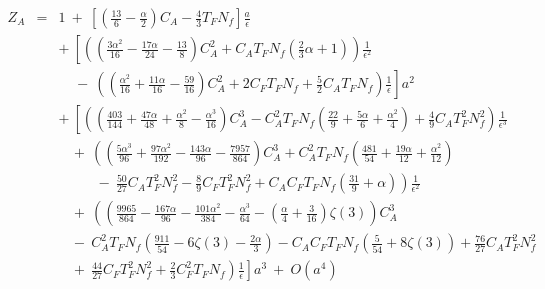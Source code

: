 \documentclass[a4paper,11pt]{article}
\newcommand{\Nf}{N_{\!f}}
\begin{document}
\begin{eqnarray} 
Z_A &=& 1 ~+~ \left[ \left( \frac{13}{6} - \frac{\alpha}{2} \right) C_A 
- \frac{4}{3} T_F \Nf \right] \frac{a}{\epsilon} \nonumber \\
&& +~ \left[ \left( \left( \frac{3\alpha^2}{16} - \frac{17\alpha}{24} 
- \frac{13}{8} \right) C_A^2 + C_A T_F\Nf \left( \frac{2}{3}\alpha + 1 \right) 
\right) \frac{1}{\epsilon^2} \right. \nonumber \\
&& \left. ~~~~~-~ \left( \left( \frac{\alpha^2}{16} + \frac{11\alpha}{16}
- \frac{59}{16} \right) C_A^2 + 2 C_F T_F\Nf + \frac{5}{2} C_A T_F \Nf \right) 
\frac{1}{\epsilon} \right] a^2 \nonumber \\ 
&& +~ \left[ \left( \left( \frac{403}{144} + \frac{47\alpha}{48} 
+ \frac{\alpha^2}{8} - \frac{\alpha^3}{16} \right) C_A^3 
- C_A^2 T_F\Nf \left( \frac{22}{9} + \frac{5\alpha}{6} + \frac{\alpha^2}{4} 
\right) + \frac{4}{9} C_A T_F^2 \Nf^2 \right) \frac{1}{\epsilon^3} \right. 
\nonumber \\
&& \left. ~~~~+~ \left( \left( \frac{5\alpha^3}{96} + \frac{97\alpha^2}{192} 
- \frac{143\alpha}{96} - \frac{7957}{864} \right) C_A^3 
+ C_A^2 T_F\Nf \left( \frac{481}{54} + \frac{19\alpha}{12} 
+ \frac{\alpha^2}{12} \right) \right. \right. \nonumber \\
&& \left. \left. ~~~~~~~~~~~~-~ \frac{50}{27} C_A T_F^2 \Nf^2 
- \frac{8}{9} C_F T_F^2 \Nf^2 + C_A C_F T_F\Nf \left( \frac{31}{9} + \alpha 
\right) \right) \frac{1}{\epsilon^2} \right. \nonumber \\
&& \left. ~~~~+~ \left( \left( \frac{9965}{864} - \frac{167\alpha}{96} 
- \frac{101\alpha^2}{384} - \frac{\alpha^3}{64} - \left( \frac{\alpha}{4} 
+ \frac{3}{16} \right) \zeta(3) \right) C_A^3 \right. \right. \nonumber \\ 
&& \left. \left. ~~~~-~ C_A^2 T_F\Nf \left( \frac{911}{54} - 6\zeta(3) 
- \frac{2\alpha}{3} \right) 
- C_A C_F T_F\Nf \left( \frac{5}{54} + 8\zeta(3) \right) 
+ \frac{76}{27} C_A T_F^2 \Nf^2 \right. \right. \nonumber \\
&& \left. \left. ~~~~+~ \frac{44}{27} C_F T_F^2 \Nf^2 
+ \frac{2}{3} C_F^2 T_F \Nf \right) \frac{1}{\epsilon} \right] a^3 ~+~ O(a^4) 
\label{Za} 
\end{eqnarray} 
\end{document}
